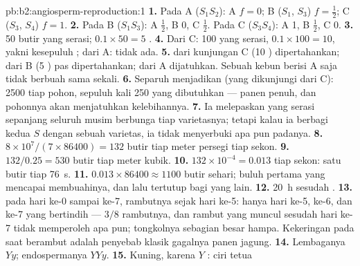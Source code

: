\begin{solution}{pb:b2:angiosperm-reproduction:1}
\textbf{1.} Pada A ($S_1S_2$):  A $f = 0$; B ($S_1$, $S_3$) $f =
\tfrac12$; C ($S_3$, $S_4$) $f = 1$.
\textbf{2.} Pada B ($S_1S_3$): A $\tfrac12$, B 0, C $\tfrac12$. Pada C
($S_3S_4$): A 1, B $\tfrac12$, C 0.
\textbf{3.} 50 butir yang serasi; $0.1\times 50 = 5$ .
\textbf{4.} Dari C: 100 yang serasi, $0.1\times 100 = 10$, yakni
kesepuluh ; dari A: tidak ada.
\textbf{5.}  dari kunjungan C (10 ) dipertahankan; dari B (5
) pas dipertahankan; dari A dijatuhkan. Sebuah kebun berisi A saja
tidak berbuah sama sekali.
\textbf{6.} Separuh  menjadikan  (yang dikunjungi dari C):
2500  tiap pohon, sepuluh kali 250 yang dibutuhkan --- panen penuh,
dan pohonnya akan menjatuhkan kelebihannya.
\textbf{7.} Ia melepaskan  yang serasi sepanjang seluruh
musim berbunga tiap varietasnya; tetapi kalau ia berbagi kedua  $S$
dengan sebuah varietas, ia tidak menyerbuki apa pun padanya.
\textbf{8.} $8\times 10^{7}/(7\times 86400) = 132$ butir tiap meter
persegi tiap sekon.
\textbf{9.} $132/0.25 = 530$ butir tiap meter kubik.
\textbf{10.} $132\times 10^{-4} = 0.013$ tiap sekon: satu butir tiap
\qty{76}{s}.
\textbf{11.} $0.013\times 86400 \approx 1100$ butir sehari; buluh
pertama yang mencapai  membuahinya, dan  lalu
tertutup bagi yang lain.
\textbf{12.} \qty{20}{h} sesudah .
\textbf{13.}  pada hari ke-0 sampai ke-7, rambutnya sejak
hari ke-5: hanya hari ke-5, ke-6, dan ke-7 yang bertindih --- $3/8$
rambutnya, dan rambut yang muncul sesudah hari ke-7 tidak memperoleh
apa pun; tongkolnya sebagian besar hampa. Kekeringan pada saat
berambut adalah penyebab klasik gagalnya panen jagung.
\textbf{14.} Lembaganya $Yy$; endospermanya $YYy$.
\textbf{15.} Kuning, karena $Y$ : ciri tetua 

\end{solution}
